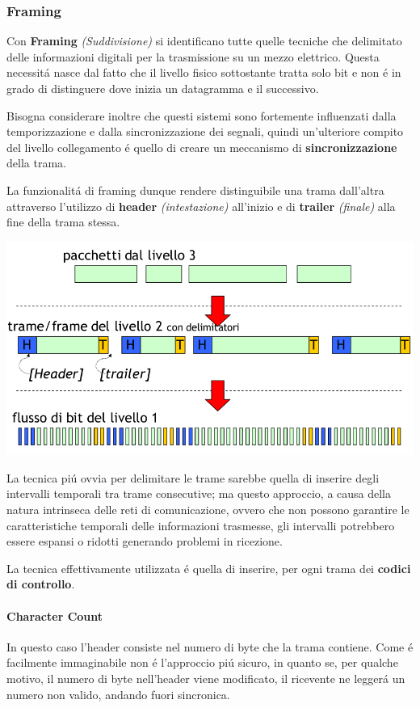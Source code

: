 \documentclass[12pt]{article}
\begin{document}
\subsubsection{Framing}\label{livello-collegamento-funzioni-framing}
Con \textbf{Framing} \textit{(Suddivisione)} si identificano tutte quelle tecniche che delimitato delle informazioni 
digitali per la trasmissione su un mezzo elettrico. Questa necessit\'a nasce dal fatto che il livello fisico sottostante 
tratta solo bit e non \'e in grado di distinguere dove inizia un datagramma e il successivo.

Bisogna considerare inoltre che questi sistemi sono fortemente influenzati dalla temporizzazione e dalla sincronizzazione
dei segnali, quindi un'ulteriore compito del livello collegamento \'e quello di creare un meccanismo di 
\textbf{sincronizzazione} della trama.

La funzionalit\'a di framing dunque rendere distinguibile una trama dall'altra attraverso l'utilizzo di \textbf{header} 
\textit{(intestazione)} all'inizio e di \textbf{trailer} \textit{(finale)} alla fine della trama stessa.
\begin{center}
	\includegraphics[scale=0.35]{livello_collegamento-img2.png}
\end{center}
La tecnica pi\'u ovvia per delimitare le trame sarebbe quella di inserire degli intervalli temporali tra trame consecutive; 
ma questo approccio, a causa della natura intrinseca delle reti di comunicazione, ovvero che non possono garantire le 
caratteristiche temporali delle informazioni trasmesse, gli intervalli potrebbero essere espansi o ridotti generando 
problemi in ricezione.

La tecnica effettivamente utilizzata \'e quella di inserire, per ogni trama dei \textbf{codici di controllo}.

\paragraph{Character Count} In questo caso l'header consiste nel numero di byte che la trama contiene. Come \'e
facilmente immaginabile non \'e l'approccio pi\'u sicuro, in quanto se, per qualche motivo, il numero di byte nell'header
viene modificato, il ricevente ne legger\'a un numero non valido, andando fuori sincronica.
\end{document}
